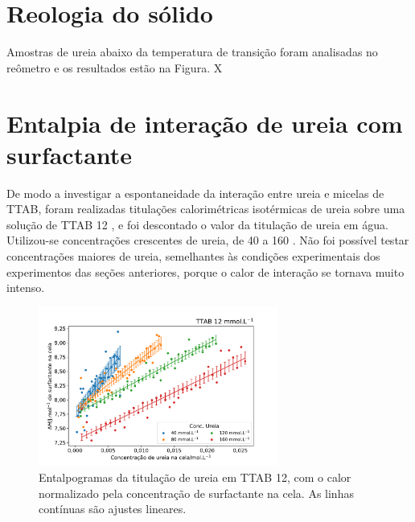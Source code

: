 
\section{Reologia do sólido}

Amostras de ureia abaixo da temperatura de transição foram analisadas no reômetro e os resultados estão na Figura. X

\section{Entalpia de interação de ureia com surfactante}

	De modo a investigar a espontaneidade da interação entre ureia e micelas de TTAB, foram realizadas titulações calorimétricas isotérmicas de ureia sobre uma solução de TTAB 12 \mM, e foi descontado o valor da titulação de ureia em água. Utilizou-se concentrações crescentes de ureia, de 40 a 160 \mM. Não foi possível testar concentrações maiores de ureia, semelhantes às condições experimentais dos experimentos das seções anteriores, porque o calor de interação se tornava muito intenso.

\begin{figure}[H]
	\centering
	\includegraphics[width=0.7\textwidth]{imagens/itc/interacao_ureia_surf}
	\caption{Entalpogramas da titulação de ureia em TTAB 12\mM, com o calor normalizado pela concentração de surfactante na cela. As linhas contínuas são ajustes lineares.}
	\label{fig:itc_interacaoUrSurf_entalpograma}
\end{figure}


